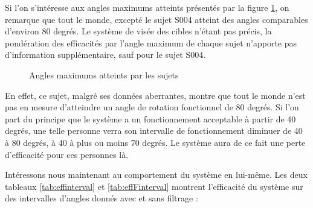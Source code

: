 \documentclass[letterpaper, twoside, 12pt, memoire, creativecommons, hyperref]{thETS}
\begin{document}
Si l'on s'intéresse aux angles maximums atteints présentés par la figure \ref{fig:anglesmax}, on remarque que tout le monde, excepté le sujet S004 atteint des angles comparables d'environ 80 degrés. Le système de visée des cibles n'étant pas précis, la pondération des efficacités par l'angle maximum de chaque sujet n'apporte pas d'information supplémentaire, sauf pour le sujet S004. 

\begin{figure}
	\centering
	\caption{Angles maximums atteints par les sujets}
	\label{fig:anglesmax}
\end{figure}

En effet, ce sujet, malgré ses données aberrantes, montre que tout le monde n'est pas en mesure d'atteindre un angle de rotation fonctionnel de 80 degrés. Si l'on part du principe que le système a un fonctionnement acceptable à partir de 40 degrés, une telle personne verra son intervalle de fonctionnement diminuer de 40 à 80 degrés, à 40 à plus ou moins 70 degrés. Le système aura de ce fait une perte d'efficacité pour ces personnes là. 

Intéressons nous maintenant au comportement du système en lui-même. Les deux tableaux \ref{tab:effinterval} et \ref{tab:effFinterval} montrent l'efficacité du système sur des intervalles d'angles donnés avec et sans filtrage : 
\end{document}
